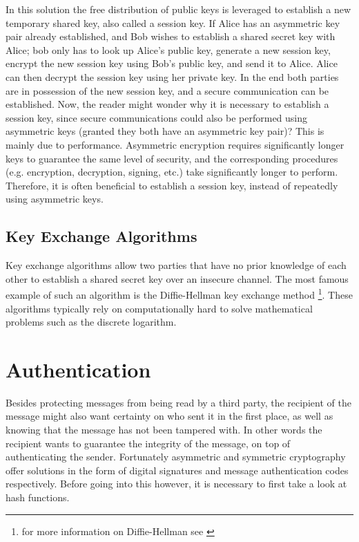 In this solution the free distribution of public keys is leveraged to establish a new temporary shared key, also called a session key. If Alice has an asymmetric key pair already established, and Bob wishes to establish a shared secret key with Alice; bob only has to look up Alice's public key, generate a new session key, encrypt the new session key using Bob's public key, and send it to Alice. Alice can then decrypt the session key using her private key. In the end both parties are in possession of the new session key, and a secure communication can be established. Now, the reader might wonder why it is necessary to establish a session key, since secure communications could also be performed using asymmetric keys (granted they both have an asymmetric key pair)? This is mainly due to performance. Asymmetric encryption requires significantly longer keys to guarantee the same level of security, and the corresponding procedures (e.g. encryption, decryption, signing, etc.) take significantly longer to perform. Therefore, it is often beneficial to establish a session key, instead of repeatedly using asymmetric keys.

\subsection{Key Exchange Algorithms} 
\label{subsec:key_exhange_algorithms}

Key exchange algorithms allow two parties that have no prior knowledge of each other to establish a shared secret key over an insecure channel. The most famous example of such an algorithm is the Diffie-Hellman key exchange method \footnote{for more information on Diffie-Hellman see \cite{wiki:DH}}. These algorithms typically rely on computationally hard to solve mathematical problems such as the discrete logarithm.

\section{Authentication} 
\label{sec:authentication}

Besides protecting messages from being read by a third party, the recipient of the message might also want certainty on who sent it in the first place, as well as knowing that the message has not been tampered with. In other words the recipient wants to guarantee the integrity of the message, on top of authenticating the sender. Fortunately asymmetric and symmetric cryptography offer solutions in the form of digital signatures and message authentication codes respectively. Before going into this however, it is necessary to first take a look at hash functions.

